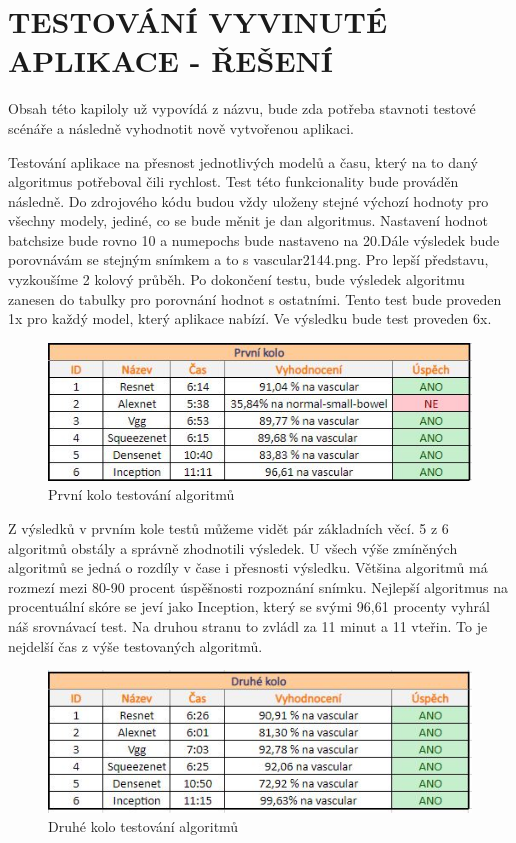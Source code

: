 \documentclass[journal]{IEEEtran}
\begin{document}
\section{TESTOVÁNÍ VYVINUTÉ APLIKACE - ŘEŠENÍ}
Obsah této kapiloly už vypovídá z názvu, bude zda potřeba stavnoti testové scénáře a následně vyhodnotit nově vytvořenou aplikaci.

Testování aplikace na přesnost jednotlivých modelů a času, který na to daný algoritmus potřeboval čili rychlost. Test této funkcionality bude prováděn následně. Do zdrojového kódu budou vždy uloženy stejné výchozí hodnoty pro všechny modely, jediné, co se bude měnit je dan algoritmus. Nastavení hodnot batchsize bude rovno 10 a numepochs bude nastaveno na 20.Dále výsledek bude porovnávám se stejným snímkem a to s vascular2144.png. Pro lepší představu, vyzkoušíme 2 kolový průběh. Po dokončení testu, bude výsledek algoritmu zanesen do tabulky pro porovnání hodnot s ostatními. Tento test bude proveden 1x pro každý model, který aplikace nabízí. Ve výsledku bude test proveden 6x.

\begin{figure}[h!]
  \includegraphics[width=\linewidth]{images/firstround.JPG}
  \caption{První kolo testování algoritmů}
\end{figure}

Z výsledků v prvním kole testů můžeme vidět pár základních věcí. 5 z 6 algoritmů obstály a správně zhodnotili výsledek. U všech výše zmíněných algoritmů se jedná o rozdíly v čase i přesnosti výsledku. Většina algoritmů má rozmezí mezi 80-90 procent úspěšnosti rozpoznání snímku. Nejlepší algoritmus na procentuální skóre se jeví jako Inception, který se svými 96,61 procenty vyhrál náš srovnávací test. Na druhou stranu to zvládl za 11 minut a 11 vteřin. To je nejdelší čas z výše testovaných algoritmů. 

\begin{figure}[h!]
  \includegraphics[width=\linewidth]{images/secondround.JPG}
  \caption{Druhé kolo testování algoritmů}
\end{figure}
\end{document}
